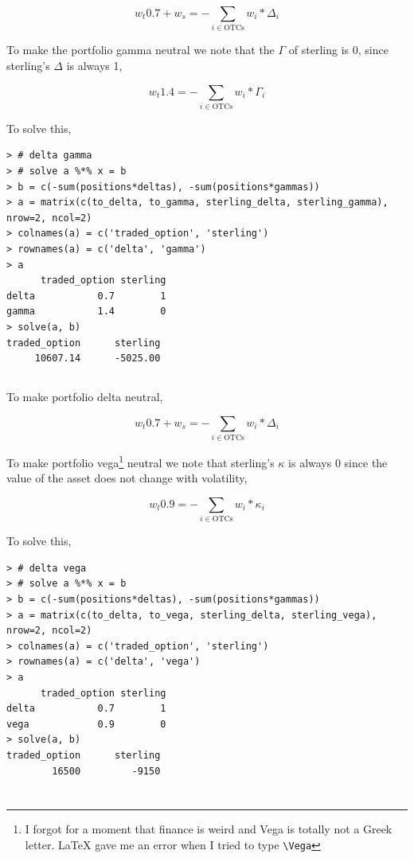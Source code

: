 \documentclass[11pt]{scrartcl}
\begin{document}
\[w_t 0.7 + w_s = -\sum_{i \in \mathrm{OTCs}} w_i * \Delta_i\]

To make the portfolio gamma neutral we note that the $\Gamma$ of sterling is 0, since sterling's $\Delta$ is always 1,

\[w_t 1.4 = -\sum_{i \in \mathrm{OTCs}} w_i * \Gamma_i\]

To solve this,

\begin{lstlisting}
> # delta gamma
> # solve a %*% x = b
> b = c(-sum(positions*deltas), -sum(positions*gammas))
> a = matrix(c(to_delta, to_gamma, sterling_delta, sterling_gamma), nrow=2, ncol=2)
> colnames(a) = c('traded_option', 'sterling')
> rownames(a) = c('delta', 'gamma')
> a
      traded_option sterling
delta           0.7        1
gamma           1.4        0
> solve(a, b)
traded_option      sterling 
     10607.14      -5025.00 
\end{lstlisting}

\subsection{}

To make portfolio delta neutral,

\[w_t 0.7 + w_s = -\sum_{i \in \mathrm{OTCs}} w_i * \Delta_i\]


To make portfolio vega\footnote{I forgot for a moment that finance is weird and Vega is totally not a Greek letter. \LaTeX{} gave me an error when I tried to type \texttt{\textbackslash Vega}} neutral we note that sterling's $\kappa$ is always 0 since the value of the asset does not change with volatility,

\[w_t 0.9 = -\sum_{i \in \mathrm{OTCs}} w_i * \kappa_i\]

To solve this,

\begin{lstlisting}
> # delta vega
> # solve a %*% x = b
> b = c(-sum(positions*deltas), -sum(positions*gammas))
> a = matrix(c(to_delta, to_vega, sterling_delta, sterling_vega), nrow=2, ncol=2)
> colnames(a) = c('traded_option', 'sterling')
> rownames(a) = c('delta', 'vega')
> a
      traded_option sterling
delta           0.7        1
vega            0.9        0
> solve(a, b)
traded_option      sterling 
        16500         -9150 
\end{lstlisting}

\section{}
\end{document}
